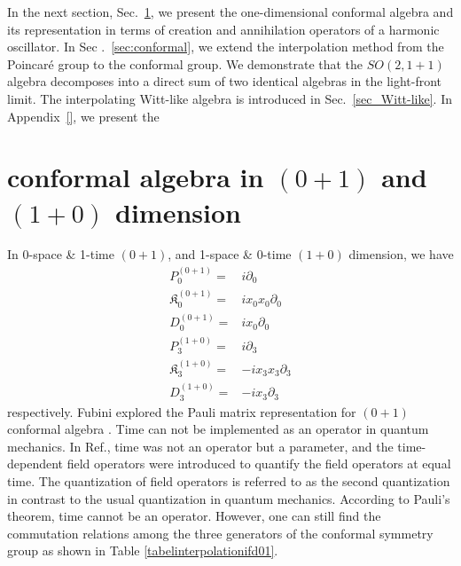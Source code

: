 \documentclass[%
 reprint,
superscriptaddress,
 amsmath,amssymb,
 aps,
]{revtex4-2}
\begin{document}
In the next section, Sec.~\ref{sec:conformal0110}, we present the one-dimensional conformal algebra and its representation in terms of creation and annihilation operators of a harmonic oscillator. In Sec .~\ref{sec:conformal}, we extend the interpolation method from the Poincar\'e group to the conformal group. We demonstrate that the $SO(2, 1 + 1)$ algebra decomposes into a direct sum of two identical algebras in the light-front limit. The interpolating Witt-like algebra is introduced in Sec.~\ref{sec_Witt-like}. 
In Appendix~\ref{}, 
we present the 



\section{conformal algebra in \texorpdfstring{$(0+1)$}
{Lg} and \texorpdfstring{$(1+0)$}{Lg} dimension}
\label{sec:conformal0110}

 In 0-space \& 1-time $(0+1)$, and 1-space \& 0-time $(1+0)$ dimension, we have
\begin{align}
    P^{(0+1)}_{0}=&i\partial_{0}\\
    \mathfrak{K}^{(0+1)}_{{0}}=&ix_{0}x_{0}\partial_{{0}}\\
    D^{(0+1)}_{0}=&ix_{0}\partial_{0}\\
    P^{(1+0)}_{3}=&i\partial_{3}\\
    \mathfrak{K}^{(1+0)}_{{3}}=&-ix_{3}x_{3}\partial_{{3}}\\
    D^{(1+0)}_{3}=&-ix_{3}\partial_{3}\label{0110xpartial}
\end{align}
respectively. Fubini explored the Pauli matrix representation for $(0+1)$ conformal algebra \cite{Fubini1976}. Time can not be implemented as an operator in quantum mechanics. In Ref.\cite{Fubini1976}, time was not an operator but a parameter, and the time-dependent field operators were introduced to quantify the field operators at equal time. The quantization of field operators is referred to as the second quantization in contrast to the usual quantization in quantum mechanics. According to Pauli's theorem\cite{Galapon1999}, time cannot be an operator. However, one can still find the commutation relations among the three generators of the conformal symmetry group as shown in Table \ref{tabelinterpolationifd01}. 
\end{document}
